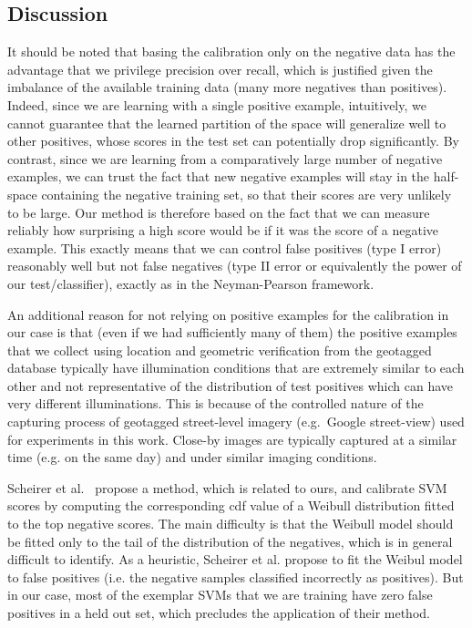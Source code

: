    \subsection{Discussion}
   \label{sec:discussion}
      It should be noted that basing the calibration only on the negative data has the advantage that we privilege precision over recall, which is justified given the imbalance of the available training data (many more negatives than positives).
      Indeed, since we are learning with a single positive example, intuitively, we cannot guarantee that the learned partition of the space will generalize well to other positives, whose scores in the test set can potentially drop significantly. %
      By contrast, since we are learning from a comparatively large number of negative examples, we can trust the fact that new negative examples will stay in the half-space containing the negative training set, so that their scores are very unlikely to be large. Our method is therefore based on the fact that we can measure reliably how surprising a high score would be if it was the score of a negative example. This exactly means that we can control false positives (type I error) reasonably well but not false negatives (type II error or equivalently the power of our test/classifier), exactly as in the Neyman-Pearson framework.

      An additional reason for not relying on positive examples for the calibration in our case is that (even if we had sufficiently many of them) the positive examples that we collect using location and geometric verification from the geotagged database typically have illumination conditions that are extremely similar to each other and not representative of the distribution of test positives which can have very different illuminations. This is because of the controlled nature of the capturing process of geotagged street-level imagery (e.g.\ Google street-view) used for experiments in this work. Close-by images are typically captured at a similar time (e.g. on the same day) and under similar imaging conditions.

      Scheirer et al.~\cite{Scheirer12} propose a method, which is related to ours, and calibrate SVM scores by computing the corresponding cdf value of a Weibull distribution fitted to the top negative scores. The main difficulty is that the Weibull model should be fitted only to the tail of the distribution of the negatives, which is in general difficult to identify. As a heuristic, Scheirer et al. propose to fit the Weibul model to false positives (i.e. the negative samples classified incorrectly as positives). But in our case, most of the exemplar SVMs that we are training have zero false positives in a held out set, which precludes the application of their method. 

